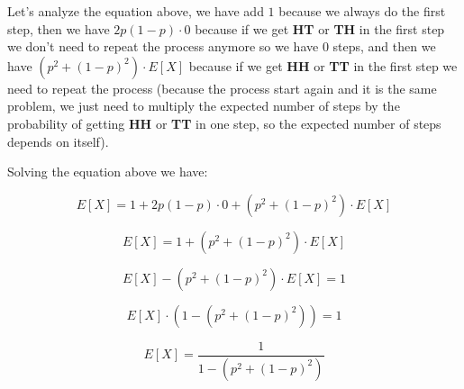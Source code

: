 \singlespacing

Let's analyze the equation above, we have add $1$ because we always do the first step,
then we have $2p(1-p) \cdot 0$ because if we get \textbf{HT} or \textbf{TH} in the first
step we don't need to repeat the process anymore so we have $0$ steps, and then we have
$(p^2 + (1-p)^2)\cdot E[X]$ because if we get \textbf{HH} or \textbf{TT} in the first
step we need to repeat the process (because the process start again and it is the same
problem, we just need to multiply the expected number of steps by the probability of
getting \textbf{HH} or \textbf{TT} in one step, so the expected number of steps
depends on itself).

\singlespacing

Solving the equation above we have:

\singlespacing

\begin{equation}
    E[X] = 1 + 2p(1-p) \cdot 0 + (p^2 + (1-p)^2)\cdot E[X]
\end{equation}

\singlespacing

\begin{equation}
    E[X] = 1 + (p^2 + (1-p)^2)\cdot E[X]
\end{equation}

\singlespacing

\begin{equation}
    E[X] - (p^2 + (1-p)^2)\cdot E[X] = 1
\end{equation}

\singlespacing

\begin{equation}
    E[X] \cdot (1 - (p^2 + (1-p)^2)) = 1
\end{equation}

\singlespacing

\begin{equation}
    E[X] = \frac{1}{1 - (p^2 + (1-p)^2)}
\end{equation}